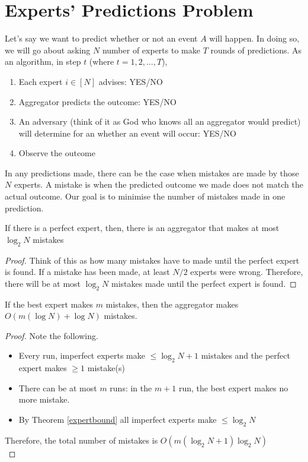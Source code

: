 \documentclass[12pt]{article}
\begin{document}
\MakeScribeTop

\section{Experts' Predictions Problem}

Let's say we want to predict whether or not an event $A$ will happen. In doing so, we will go about asking $N$ number of experts to make $T$ rounds of predictions. As an algorithm, in step $t$ (where $t = 1, 2, \ldots, T$),
\begin{enumerate}
	\item Each expert $i \in [N] $ advises: YES/NO
	\item Aggregator predicts the outcome: YES/NO
	\item An adversary (think of it as God who knows all an aggregator would predict) will determine for an whether an event will occur: YES/NO
	\item Observe the outcome 
\end{enumerate}
In any predictions made, there can be the case when mistakes are made by those $N$ experts. A mistake is when the predicted outcome we made does not match the actual outcome. Our goal is to minimise the number of mistakes made in one prediction.

\begin{theorem}
	\label{expertbound}
	If there is a perfect expert, then, there is an aggregator that makes at most $\log_{2}N$ mistakes
\end{theorem}
\begin{proof}
	Think of this as how many mistakes have to made until the perfect expert is found.
	If a mistake has been made, at least $N/2$ experts were wrong. Therefore, there will be at most  $\log_{2}N$ mistakes made until the perfect expert is found.
\end{proof}
\begin{theorem}
	\label{expertbound2}
	If the best expert makes $m$ mistakes, then the aggregator makes $O(m(\log N) + \log N)$ mistakes.
\end{theorem}
\clearpage
\begin{proof}
	Note the following.
	\begin{itemize}
		\item Every run,  imperfect experts make  $\leq \log_{2}N +1$ mistakes and the perfect expert makes $\geq 1$ mistake(s)
		\item There can be at most $m$ runs: in the $m+1$ run, the best expert makes no more mistake.
		\item By Theorem \ref{expertbound} all imperfect experts make $\leq \log_{2}N$
	\end{itemize}
	Therefore, the total number of mistakes is
	$O(m(\log_{2}N +1) \log_{2}N) $\\
\end{proof}
\end{document}

